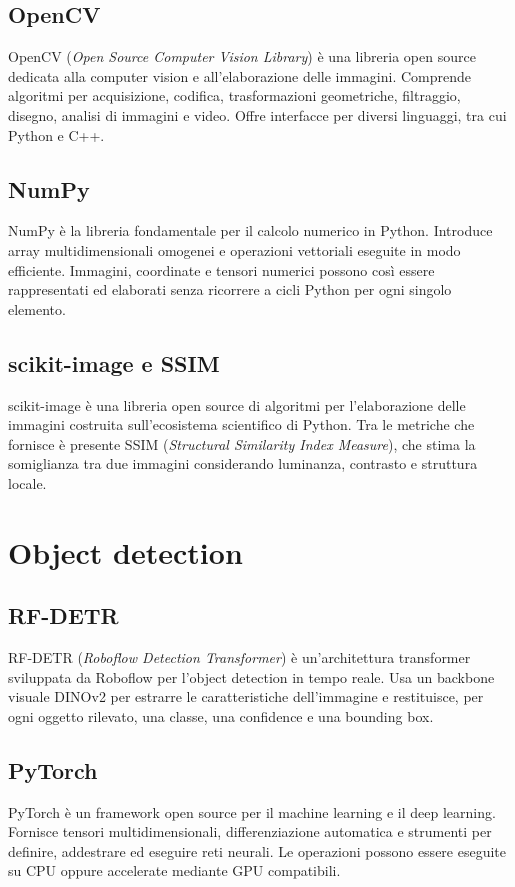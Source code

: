 \subsection{OpenCV}
OpenCV (\textit{Open Source Computer Vision Library}) è una libreria open
source dedicata alla computer vision e all'elaborazione delle immagini.
Comprende algoritmi per acquisizione, codifica, trasformazioni geometriche,
filtraggio, disegno, analisi di immagini e video. Offre interfacce per diversi
linguaggi, tra cui Python e C++.

\subsection{NumPy}
NumPy è la libreria fondamentale per il calcolo numerico in Python. Introduce
array multidimensionali omogenei e operazioni vettoriali eseguite in modo
efficiente. Immagini, coordinate e tensori numerici possono così essere
rappresentati ed elaborati senza ricorrere a cicli Python per ogni singolo
elemento.

\subsection{scikit-image e SSIM}
scikit-image è una libreria open source di algoritmi per l'elaborazione delle
immagini costruita sull'ecosistema scientifico di Python. Tra le metriche che
fornisce è presente SSIM (\textit{Structural Similarity Index Measure}), che
stima la somiglianza tra due immagini considerando luminanza, contrasto e
struttura locale.

\section{Object detection}

\subsection{RF-DETR}
RF-DETR (\textit{Roboflow Detection Transformer}) è un'architettura
transformer sviluppata da Roboflow per l'object detection in tempo reale. Usa
un backbone visuale DINOv2 per estrarre le caratteristiche dell'immagine e
restituisce, per ogni oggetto rilevato, una classe, una confidence e una
bounding box.

\subsection{PyTorch}
PyTorch è un framework open source per il machine learning e il deep learning.
Fornisce tensori multidimensionali, differenziazione automatica e strumenti per
definire, addestrare ed eseguire reti neurali. Le operazioni possono essere
eseguite su CPU oppure accelerate mediante GPU compatibili.

